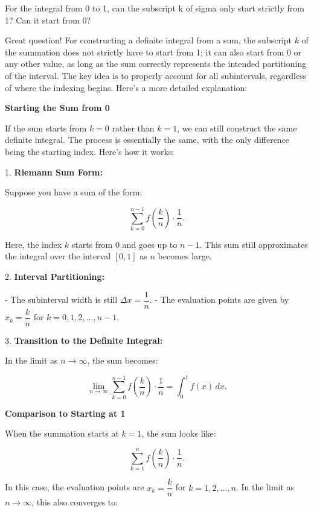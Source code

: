 \documentclass[a4paper,12pt]{book}
\begin{document}
\begin{bluebox}
For the integral from 0 to 1, can the subscript k of sigma only start strictly from 1? Can it start from 0?
\end{bluebox}

Great question! For constructing a definite integral from a sum, the subscript \(k\) of the summation does not strictly have to start from 1; it can also start from 0 or any other value, as long as the sum correctly represents the intended partitioning of the interval. The key idea is to properly account for all subintervals, regardless of where the indexing begins. Here’s a more detailed explanation:

\textbf{Starting the Sum from 0}

If the sum starts from \(k = 0\) rather than \(k = 1\), we can still construct the same definite integral. The process is essentially the same, with the only difference being the starting index. Here’s how it works:

1. \textbf{Riemann Sum Form:}

   Suppose you have a sum of the form:
   
   \[
   \sum_{k=0}^{n-1} f\left(\dfrac{k}{n}\right) \cdot \dfrac{1}{n}.
   \]
   
   Here, the index \(k\) starts from 0 and goes up to \(n-1\). This sum still approximates the integral over the interval \([0, 1]\) as \(n\) becomes large.

2. \textbf{Interval Partitioning:}

- The subinterval width is still \(\Delta x = \dfrac{1}{n}\).
- The evaluation points are given by \(x_k = \dfrac{k}{n}\) for \(k = 0, 1, 2, \ldots, n-1\).

3. \textbf{Transition to the Definite Integral:}

   In the limit as \(n \to \infty\), the sum becomes:
   
   \[
   \lim_{n \to \infty} \sum_{k=0}^{n-1} f\left(\dfrac{k}{n}\right) \cdot \dfrac{1}{n} = \int_0^1 f(x) \, dx.
   \]

\textbf{Comparison to Starting at 1}

When the summation starts at \(k = 1\), the sum looks like:

\[
\sum_{k=1}^{n} f\left(\dfrac{k}{n}\right) \cdot \dfrac{1}{n}.
\]

In this case, the evaluation points are \(x_k = \dfrac{k}{n}\) for \(k = 1, 2, \ldots, n\). In the limit as \(n \to \infty\), this also converges to:
\end{document}
